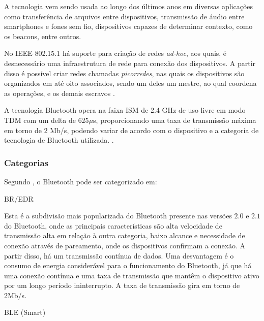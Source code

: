 A tecnologia vem sendo usada ao longo dos últimos anos em diversas aplicações como transferência de 
arquivos entre dispositivos, transmissão de áudio entre smartphones e fones sem fio, dispositivos 
capazes de determinar contexto, como os beacons, entre outros.

No IEEE 802.15.1 há suporte para criação de redes \textit{ad-hoc}, aos quais, é desnecessário uma 
infraestrutura de rede para conexão dos dispositivos. A partir disso é possível criar redes 
chamadas \textit{picorredes}, nas quais os dispositivos são organizados em até oito associados, 
sendo um deles um mestre, ao qual coordena as operações, e os demais escravos 
\cite{bluetoothSIG2017}.

A tecnologia Bluetooth opera na faixa ISM de 2.4 GHz de uso livre em modo TDM com 
um delta de $625\mu$s, proporcionando uma taxa de transmissão máxima em torno de 2 Mb/s, podendo 
variar de acordo com o dispositivo e a categoria de tecnologia de Bluetooth utilizada. 
\cite{bluetoothSIG2017}.


\subsubsection{Categorias}

Segundo \cite{sig2017}, o Bluetooth pode ser categorizado em:

BR/EDR

Esta é a subdivisão mais popularizada do Bluetooth presente nas versões $2.0$ e $2.1$ do Bluetooth, 
onde as principais características são alta velocidade de transmissão alta em relação à outra 
categoria, baixo alcance e necessidade de conexão através de pareamento, onde os dispositivos 
confirmam a conexão. A partir disso, há um transmissão contínua de dados. 
Uma desvantagem é o consumo de energia considerável para o funcionamento do Bluetooth, já que há 
uma conexão contínua e uma taxa de transmissão que mantêm o dispositivo ativo por um longo 
período ininterrupto.
A taxa de transmissão gira em torno de 2Mb/s.
 
BLE (Smart)

